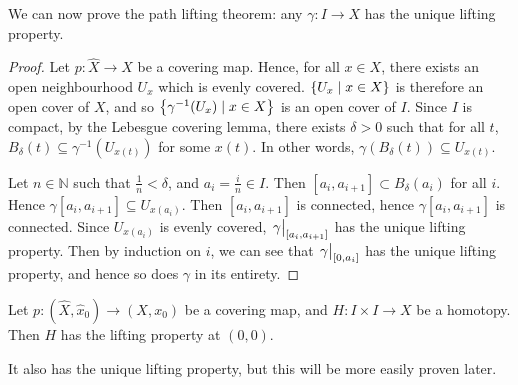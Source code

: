 We can now prove the path lifting theorem: any \( \gamma \colon I \to X \) has the unique lifting property.
\begin{proof}
	Let \( p \colon \hat X \to X \) be a covering map.
	Hence, for all \( x \in X \), there exists an open neighbourhood \( U_x \) which is evenly covered.
	\( \qty{U_x \mid x \in X} \) is therefore an open cover of \( X \), and so \( \qty{\gamma^{-1}(U_x) \mid x \in X} \) is an open cover of \( I \).
	Since \( I \) is compact, by the Lebesgue covering lemma, there exists \( \delta > 0 \) such that for all \( t \), \( B_\delta(t) \subseteq \gamma^{-1}(U_{x(t)}) \) for some \( x(t) \).
	In other words, \( \gamma(B_\delta(t)) \subseteq U_{x(t)} \).

	Let \( n \in \mathbb N \) such that \( \frac 1n < \delta \), and \( a_i = \frac{i}{n} \in I \).
	Then \( [a_i, a_{i+1}] \subset B_\delta(a_i) \) for all \( i \).
	Hence \( \gamma[a_i,a_{i+1}] \subseteq U_{x(a_i)} \).
	Then \( [a_i,a_{i+1}] \) is connected, hence \( \gamma[a_i, a_{i+1}] \) is connected.
	Since \( U_{x(a_i)} \) is evenly covered, \( \eval{\gamma}_{[a_i,a_{i+1}]} \) has the unique lifting property.
	Then by induction on \( i \), we can see that \( \eval{\gamma}_{[0,a_i]} \) has the unique lifting property, and hence so does \( \gamma \) in its entirety.
\end{proof}
\begin{theorem}
	Let \( p \colon (\hat X, \hat x_0) \to (X, x_0) \) be a covering map, and \( H \colon I \times I \to X \) be a homotopy.
	Then \( H \) has the lifting property at \( (0,0) \).
\end{theorem}
It also has the unique lifting property, but this will be more easily proven later.
